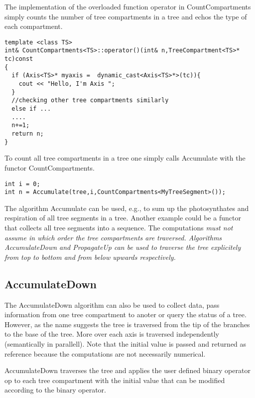 The  implementation   of   the  overloaded   function     operator  in
CountCompartments simply  counts the number of  tree compartments in a
tree and echos the type of each compartment.

\begin{verbatim}
template <class TS>
int& CountCompartments<TS>::operator()(int& n,TreeCompartment<TS>* tc)const
{
  if (Axis<TS>* myaxis =  dynamic_cast<Axis<TS>*>(tc)){
    cout << "Hello, I'm Axis ";
  }
  //checking other tree compartments similarly
  else if ...  
  ....
  n+=1;
  return n;
}
\end{verbatim}

To count all tree compartments in a tree one simply calls Accumulate
with the functor CountCompartments.

\begin{verbatim}
int i = 0;
int n = Accumulate(tree,i,CountCompartments<MyTreeSegment>());
\end{verbatim}

The  algorithm   Accumulate  can  be   used,  e.g.,  to  sum   up  the
photosynthates and respiration of all tree segments in a tree. Another
example  could be a  functor that  collects all  tree segments  into a
sequence.  The computations \it must not assume \rm in which order the
tree  compartments  are   traversed.   Algorithms  AccumulateDown  and
PropagateUp can be  used to traverse the tree  explicitely from top to
bottom and from below upwards respectively.

\subsection{AccumulateDown}

The AccumulateDown  algorithm can also  be used to collect  data, pass
information from one tree compartment to anoter or query the status of
a tree.  However, as the name  suggests the tree is traversed from the
tip of the branches  to the base of the tree.  More  over each axis is
traversed  independently (semantically in  parallell).  Note  that the
initial  value  is  passed  and  returned  as  reference  because  the
computations are not necessarily numerical.

AccumulateDown traverses the tree and  applies the user defined binary
operator op  to each tree compartment  with the initial value that can
be modified according to the binary operator.

